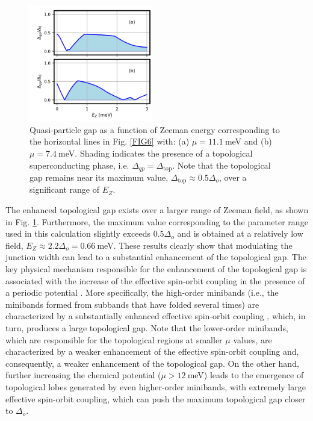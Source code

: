 \documentclass[twocolumn,aps,prb,nofootinbib]{revtex4-2}
\begin{document}
\begin{figure}[t]
\begin{center}
\includegraphics[width=0.48\textwidth]{Fig8.png}
\end{center}
\vspace{-3mm}
\caption{Quasi-particle gap as a function of Zeeman energy corresponding to the horizontal lines in Fig. \ref{FIG6} with: (a) $\mu = 11.1~$meV and (b) $\mu = 7.4~$meV. Shading  indicates the presence of a topological superconducting phase, i.e. $\Delta_{qp} = \Delta_{\text{top}}$. Note that the topological gap remains near its maximum value, $\Delta_{\text{top}} \approx 0.5 \Delta_o$, over a significant range of $E_Z$.}
\label{FIG8}
\vspace{-3mm}
\end{figure}

The enhanced topological gap  exists over a larger range of Zeeman field, as shown  in Fig. \ref{FIG8}. Furthermore, the maximum value corresponding to the parameter range used in this calculation slightly exceeds $0.5\Delta_o$ and is obtained at a relatively low field, $E_Z \approx 2.2\Delta_o=0.66~$meV. These results clearly show that modulating the junction width can lead to a substantial enhancement of the topological gap.
The key physical mechanism responsible for the enhancement of the topological gap is associated with the increase of the effective spin-orbit coupling in the presence of a periodic potential \cite{Woods2020b}. More specifically,  the high-order minibands (i.e., the minibands formed from subbands that have folded several times) are characterized by a substantially enhanced effective spin-orbit coupling \cite{Woods2020b}, which, in turn, produces a large topological gap. 
Note that the lower-order minibands, which are responsible for the topological regions at smaller $\mu$ values, are characterized by a weaker enhancement of the effective spin-orbit coupling and, consequently, a weaker enhancement of the topological gap. On the other hand,  further increasing the chemical potential ($\mu>12~$meV) leads to the emergence of topological lobes generated by even higher-order minibands, with extremely large effective spin-orbit coupling, which can push the maximum topological gap closer to $\Delta_o$.
\end{document}
